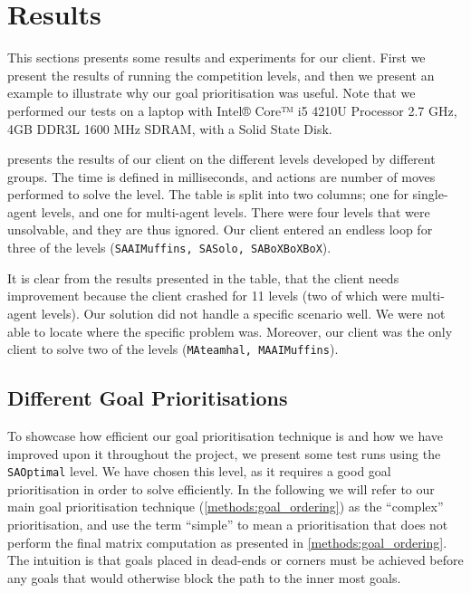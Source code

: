 \section{Results}
\label{sec:results}


This sections presents some results and experiments for our client.
First we present the results of running the competition levels, and then we present an example to illustrate why our goal prioritisation was useful.
Note that we performed our tests on a laptop with Intel® Core™ i5 4210U Processor 2.7 GHz, 4GB DDR3L 1600 MHz SDRAM, with a Solid State Disk.

 presents the results of our client on the different levels developed by different groups.
The time is defined in milliseconds, and actions are number of moves performed to solve the level.
The table is split into two columns; one for single-agent levels, and one for multi-agent levels.
There were four levels that were unsolvable, and they are thus ignored.
Our client entered an endless loop for three of the levels (\texttt{SAAIMuffins, SASolo, SABoXBoXBoX}).

It is clear from the results presented in the table, that the client needs improvement because the client crashed for 11 levels (two of which were multi-agent levels).
Our solution did not handle a specific scenario well.
We were not able to locate where the specific problem was.
Moreover, our client was the only client to solve two of the levels (\texttt{MAteamhal, MAAIMuffins}).



\subsection{Different Goal Prioritisations}

To showcase how efficient our goal prioritisation technique is and how we have improved upon it throughout the project, we present some test runs using the \texttt{SAOptimal} level. 
We have chosen this level, as it requires a good goal prioritisation in order to solve efficiently.
In the following we will refer to our main goal prioritisation technique (\cref{methods:goal_ordering}) as the ``complex'' prioritisation, and use the term ``simple'' to mean a prioritisation that does not perform the final matrix computation as presented in \cref{methods:goal_ordering}.
The intuition is that goals placed in dead-ends or corners must be achieved before any goals that would otherwise block the path to the inner most goals.

